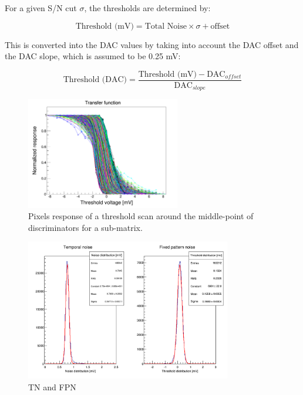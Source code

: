   For a given S/N cut $\sigma$, the thresholds are determined by:

  \begin{equation}
    \text{Threshold (mV)} = \text{Total Noise} \times \sigma + \text{offset}
  \end{equation}

  This is converted into the DAC values by taking into account the DAC offset and the DAC slope, which is assumed to be 0.25 mV:
  
  \begin{equation}
    \text{Threshold (DAC)} = \frac{\text{Threshold (mV)} - \text{DAC}_{offset}}{\text{DAC}_{slope}}
  \end{equation}
 
  \begin{figure}
    \centering
    \includegraphics[width=0.6\textwidth]{Pictures/labTests/transfer_B.png}
    \caption{Pixels response of a threshold scan around the middle-point of discriminators for a sub-matrix.}
    \label{fig:transfer}
  \end{figure}

  \begin{figure}
    \centering
    \includegraphics[width=0.8\textwidth]{Pictures/labTests/noise_A.png}
    \caption{TN and FPN}
    \label{fig:TN&FPN}
  \end{figure}

